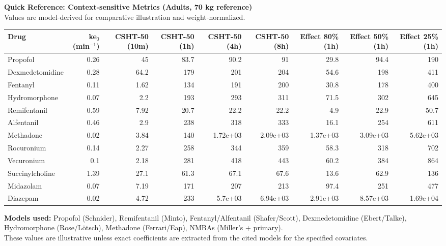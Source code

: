 \documentclass[10pt,landscape]{article}
\begin{document}
\centering
{\Large\textbf{Quick Reference: Context-sensitive Metrics (Adults, 70 kg reference)}}\\[4pt]
\footnotesize Values are model-derived for comparative illustration and weight-normalized.\\[6pt]
\scriptsize
\begin{tabular}{lrrrrrrrr}
\toprule
Drug & ke$_0$ (min$^{-1}$) & CSHT-50 (10m) & CSHT-50 (1h) & CSHT-50 (4h) & CSHT-50 (8h) & Effect 80\% (1h) & Effect 50\% (1h) & Effect 25\% (1h) \\
\midrule
 Propofol & 0.26 & 45 & 83.7 & 90.2 & 91 & 29.8 & 94.4 & 190 \\
 Dexmedetomidine & 0.28 & 64.2 & 179 & 201 & 204 & 54.6 & 198 & 411 \\
 Fentanyl & 0.11 & 1.62 & 134 & 191 & 200 & 30.8 & 178 & 400 \\
 Hydromorphone & 0.07 & 2.2 & 193 & 293 & 311 & 71.5 & 302 & 645 \\
 Remifentanil & 0.59 & 7.92 & 20.7 & 22.2 & 22.2 & 4.9 & 22.9 & 50.7 \\
 Alfentanil & 0.46 & 2.9 & 238 & 318 & 333 & 16.1 & 254 & 611 \\
 Methadone & 0.02 & 3.84 & 140 & 1.72e+03 & 2.09e+03 & 1.37e+03 & 3.09e+03 & 5.62e+03 \\
 Rocuronium & 0.14 & 2.27 & 258 & 344 & 359 & 58.3 & 318 & 702 \\
 Vecuronium & 0.1 & 2.18 & 281 & 418 & 443 & 60.2 & 384 & 864 \\
 Succinylcholine & 1.39 & 27.1 & 61.3 & 67.1 & 67.6 & 13.6 & 62.9 & 136 \\
 Midazolam & 0.07 & 7.19 & 171 & 207 & 213 & 97.4 & 251 & 477 \\
 Diazepam & 0.02 & 4.72 & 233 & 5.7e+03 & 6.94e+03 & 2.91e+03 & 8.57e+03 & 1.69e+04 \\

\bottomrule
\end{tabular}
\vspace{6pt}

\normalsize\textbf{Models used:} Propofol (Schnider), Remifentanil (Minto), Fentanyl/Alfentanil (Shafer/Scott), Dexmedetomidine (Ebert/Talke), Hydromorphone (Rose/Lötsch), Methadone (Ferrari/Eap), NMBAs (Miller's + primary).\\
\scriptsize These values are illustrative unless exact coefficients are extracted from the cited models for the specified covariates.
\end{document}
